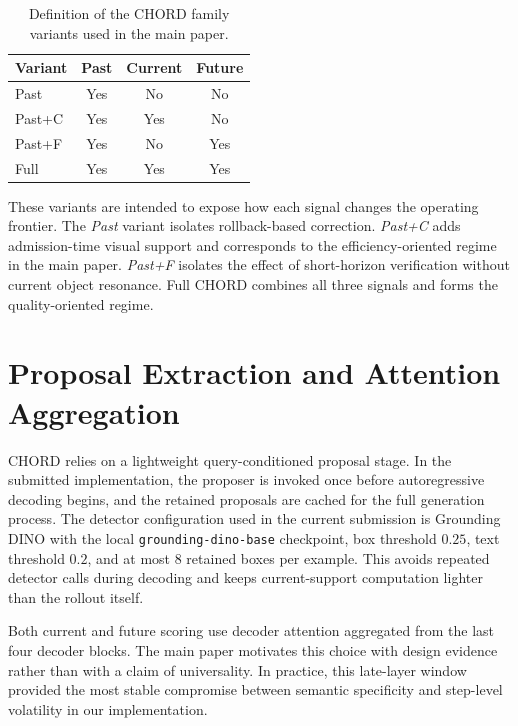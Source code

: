 \documentclass[sigconf,anonymous,nonacm]{acmart}
\begin{document}
\begin{table}[t]
\centering
\small
\caption{Definition of the CHORD family variants used in the main paper.}
\label{tab:supp_variants}
\begin{tabular}{lccc}
\toprule
\textbf{Variant} & \textbf{Past} & \textbf{Current} & \textbf{Future} \\
\midrule
Past      & Yes & No  & No  \\
Past+C    & Yes & Yes & No  \\
Past+F    & Yes & No  & Yes \\
Full      & Yes & Yes & Yes \\
\bottomrule
\end{tabular}
\end{table}

These variants are intended to expose how each signal changes the operating frontier. The \textit{Past} variant isolates rollback-based correction. \textit{Past+C} adds admission-time visual support and corresponds to the efficiency-oriented regime in the main paper. \textit{Past+F} isolates the effect of short-horizon verification without current object resonance. Full CHORD combines all three signals and forms the quality-oriented regime.

\section{Proposal Extraction and Attention Aggregation}
\label{sec:supp_proposals}

CHORD relies on a lightweight query-conditioned proposal stage. In the submitted implementation, the proposer is invoked once before autoregressive decoding begins, and the retained proposals are cached for the full generation process. The detector configuration used in the current submission is Grounding DINO with the local \texttt{grounding-dino-base} checkpoint, box threshold $0.25$, text threshold $0.2$, and at most $8$ retained boxes per example. This avoids repeated detector calls during decoding and keeps current-support computation lighter than the rollout itself.

Both current and future scoring use decoder attention aggregated from the last four decoder blocks. The main paper motivates this choice with design evidence rather than with a claim of universality. In practice, this late-layer window provided the most stable compromise between semantic specificity and step-level volatility in our implementation.
\end{document}

